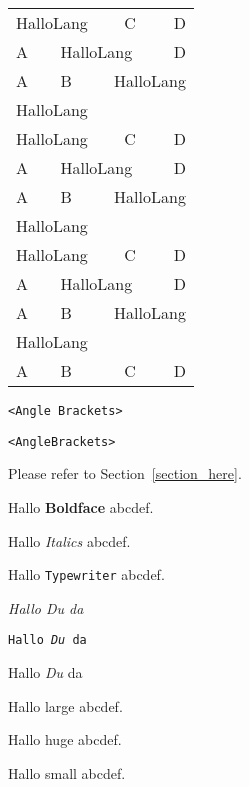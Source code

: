 \documentclass[12pt]{article}
\begin{document}
{\newcommand{\lcTabularBorder}{2}

\begin{tabular}{llcr}\hline
\multicolumn{2}{l}{HalloLang} & C & D     \\
A & \multicolumn{2}{l}{HalloLang} & D     \\
A & B & \multicolumn{2}{l}{HalloLang}     \\
\multicolumn{4}{l}{HalloLang}             \\
%
\multicolumn{2}{l}{HalloLang} & C & D     \\\hline
A & \multicolumn{2}{l}{HalloLang} & D     \\\hline
A & B & \multicolumn{2}{l}{HalloLang}     \\\hline
\multicolumn{4}{l}{HalloLang}             \\\hline
%
\multicolumn{2}{l}{HalloLang} & C & D     \\\hline\hline
A & \multicolumn{2}{l}{HalloLang} & D     \\\hline\hline
A & B & \multicolumn{2}{l}{HalloLang}     \\\hline\hline
\multicolumn{4}{l}{HalloLang}             \\\hline\hline
%
A & B & C & D                             \\\hline\hline
\end{tabular}

\begin{verbatim}
<Angle Brackets>
\end{verbatim}

\begin{alltt}
<Angle Brackets>
\end{alltt}

\label{section_here}

Please refer to Section~\ref{section_here}.

Hallo {\bf Boldface} abcdef.

Hallo {\it Italics} abcdef.

Hallo {\tt Typewriter} abcdef.

{\it Hallo {\em Du} da}

{\tt Hallo {\em Du} da}

{\sc Hallo {\em Du} da}

Hallo {\large large} abcdef.

Hallo {\huge huge} abcdef.

Hallo {\small small} abcdef.

\def\llca{Hallo}

\def\llcaa{NEIN}

}
\end{document}
